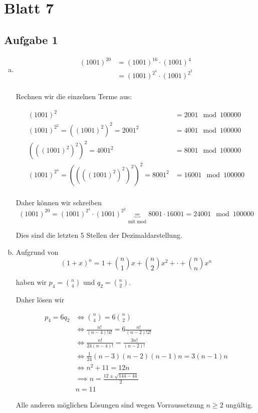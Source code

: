 \section*{Blatt 7}
%

\subsection*{Aufgabe 1}
\begin{enumerate}[a)]
\item
\begin{align*}
 (1001)^{20} &= (1001)^{16} \cdot (1001)^{4}\\
             &= (1001)^{2^{4}} \cdot (1001)^{2^{2}}\\
\end{align*}

Rechnen wir die einzelnen Terme aus:

\begin{align*}
  (1001)^2 &= 2001 \mod 100000 \\
  (1001)^{2^{2}} = ((1001)^2)^2 = 2001^2 &= 4001 \mod 100000 \\
  (((1001)^2)^2)^2 = 4001^2 &= 8001 \mod 100000 \\
  (1001)^{2^{4}} = ((((1001)^2)^2)^2)^2 = 8001^2 &= 16001 \mod 100000 \\
\end{align*}

Daher können wir schreiben
\[  (1001)^{20} = (1001)^{2^{4}} \cdot (1001)^{2^{2}} \underbrace{=}_{\text{mit mod}} 8001 \cdot 16001 = 24001 \mod 100000 \]

Dies sind die letzten 5 Stellen der Dezimaldarstellung.


\item

Aufgrund von \[ (1+x)^n = 1 + \binom{n}{1}x + \binom{n}{2}x^2 + \cdot + \binom{n}{n} x^n  \]

haben wir $p_4 = \binom{n}{4} $ und $q_2= \binom{n}{2}  $.

Daher lösen wir

\begin{align*}
p_4 = 6q_2 &\iff \binom{n}{4} = 6 \binom{n}{2} \\
           &\iff \frac{n!}{ (n-4)! 4! } =  6 \frac{n!}{(n-2)! 2!}\\
           &\iff \frac{n!}{24(n-4)!} = \frac{3n!}{(n-2)!} \\
           &\iff \frac{1}{24} (n-3)(n-2)(n-1)n = 3(n-1)n \\
           &\iff n^2 + 11 = 12n \\
           &\implies n = \frac{12 \pm \sqrt{144 - 44}}{2} \\
           &n = 11
\end{align*}

Alle anderen möglichen Lösungen sind wegen Vorraussetzung $n\geq 2$ ungültig.

\end{enumerate}

